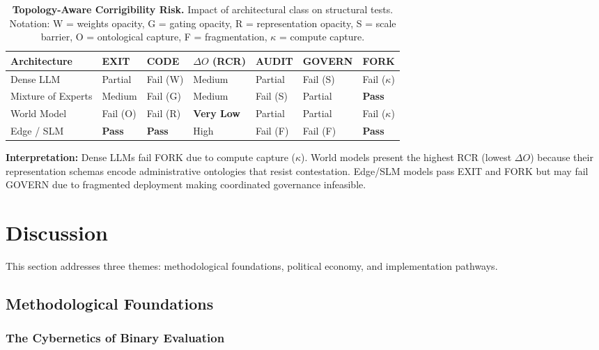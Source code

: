 \documentclass{article}
\begin{document}
\begin{table}[htbp]
\centering
\caption{\textbf{Topology-Aware Corrigibility Risk.} Impact of architectural class on structural tests. Notation: W = weights opacity, G = gating opacity, R = representation opacity, S = scale barrier, O = ontological capture, F = fragmentation, $\kappa$ = compute capture.}
\label{tab:topology-risk-arch}
\small
\begin{tabular}{@{}lllllll@{}}
\toprule
\textbf{Architecture} & \textbf{EXIT} & \textbf{CODE} & \textbf{$\Delta O$ (RCR)} & \textbf{AUDIT} & \textbf{GOVERN} & \textbf{FORK} \\
\midrule
Dense LLM & Partial & Fail (W) & Medium & Partial & Fail (S) & Fail ($\kappa$) \\
Mixture of Experts & Medium & Fail (G) & Medium & Fail (S) & Partial & \textbf{Pass} \\
World Model & Fail (O) & Fail (R) & \textbf{Very Low} & Partial & Partial & Fail ($\kappa$) \\
Edge / SLM & \textbf{Pass} & \textbf{Pass} & High & Fail (F) & Fail (F) & \textbf{Pass} \\
\bottomrule
\end{tabular}
\end{table}

\textbf{Interpretation:} Dense LLMs fail FORK due to compute capture ($\kappa$). World models present the highest RCR (lowest $\Delta O$) because their representation schemas encode administrative ontologies that resist contestation. Edge/SLM models pass EXIT and FORK but may fail GOVERN due to fragmented deployment making coordinated governance infeasible.

\section{Discussion}
\label{sec:discussion}

This section addresses three themes: methodological foundations, political economy, and implementation pathways.

\subsection{Methodological Foundations}
\label{subsec:methodology}

\subsubsection{The Cybernetics of Binary Evaluation}
\end{document}

